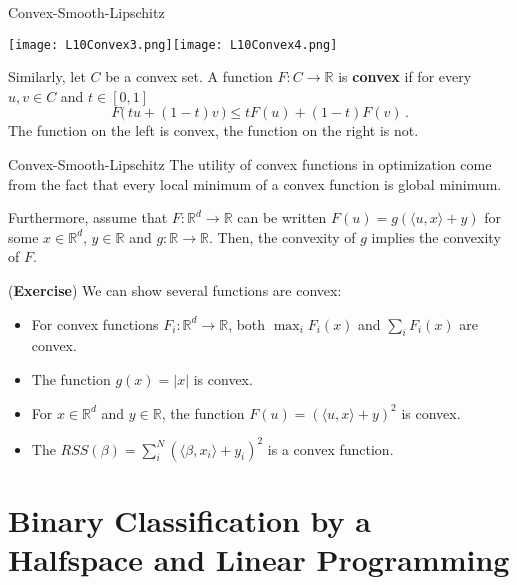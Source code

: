 \documentclass[10pt, table, dvipsnames,xcdraw, handout]{beamer}
\newcommand{\bR}{\ensuremath{\mathbb{R}}}
\begin{document}
\begin{frame}[fragile]{Convex-Smooth-Lipschitz}
  \begin{minipage}[t][0.5\textheight][t]{\textwidth}
	\centering \texttt{[image: L10Convex3.png]}\texttt{[image: L10Convex4.png]} 
  \end{minipage}
  \vfill
\begin{minipage}[t][0.5\textheight][t]{\textwidth}
Similarly, let $C$ be a convex set. A function $F:C\to \bR$ is \textbf{convex} if for every $u, v\in C$ and $t\in [0,1]$
$$
F\big(\,tu+(1-t)v\,\big) \leq t F(u) + (1-t)F(v)\,.
$$
The function on the left is convex, the function on the right is not. 
\end{minipage}
\end{frame}


\begin{frame}[fragile]{Convex-Smooth-Lipschitz}
The utility of convex functions in optimization come from the fact that every local minimum of a convex function is global minimum. \pause

Furthermore, assume that $F:\bR^d\to \bR$ can be written $F(u) = g(\langle u,x \rangle + y)$ for some $x\in \bR^d$, $y\in \bR$ and $g:\bR\to \bR$. Then, the convexity of $g$ implies the convexity of $F$. \pause

(\textbf{Exercise}) We can show several functions are convex:
\begin{itemize}
\item[] For convex functions $F_i:\bR^d\to \bR$, both $\max_{i}F_i(x)$ and $\sum_{i} F_i(x)$ are convex. \pause
\item[] The function $g(x) = |x|$ is convex. \pause
\item[] For $x\in \bR^d$ and $y\in \bR$, the function $F(u) = (\langle u,x \rangle + y)^2$ is convex. \pause
\item[] The $RSS(\beta) = \sum_i^N (\langle \beta,x_i \rangle + y_i)^2$ is a convex function.\pause
\end{itemize}
\end{frame}





\section{Binary Classification by a Halfspace and Linear Programming}
\end{document}
